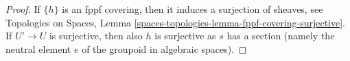 \documentclass[10pt,a4paper]{amsart}
\theoremstyle{plain}
\theoremstyle{definition}
\theoremstyle{remark}
\numberwithin{equation}{subsection}
\begin{document}
\begin{proof}
\medskip\noindent
If $\{h\}$ is an fppf covering, then it induces a surjection of sheaves, see
Topologies on Spaces,
Lemma \ref{spaces-topologies-lemma-fppf-covering-surjective}.
If $U' \to U$ is surjective, then also $h$ is surjective as $s$ has a section
(namely the neutral element $e$ of the groupoid in algebraic spaces).
\end{proof}
\end{document}

